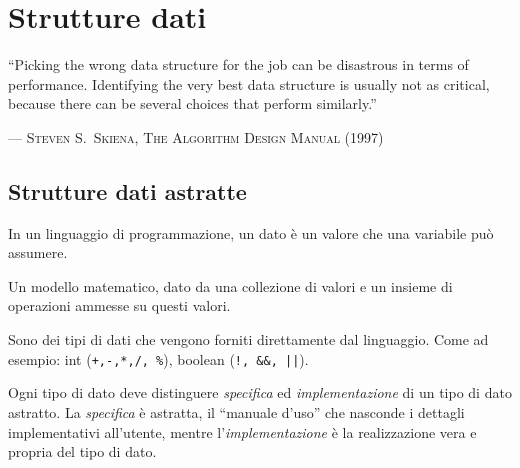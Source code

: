
\ifsubfile
\usepackage[newfloat, cachedir=_minted-cache, outputdir=../build]{minted}
\usepackage{../libraries/set-minted}

\pagestyle{plain}
\setcounter{chapter}{3}


\fi
\chapter{Strutture dati}
\epigraph{``Picking the wrong data structure for the job can be disastrous in terms of performance.
		    Identifying the very best data structure is usually not as critical, because there can be several choices that perform similarly.''}%
		 {--- \textup{\textsc{Steven S.\ Skiena, The Algorithm Design Manual (1997)}}}

\section{Strutture dati astratte}

\begin{definition}
In un linguaggio di programmazione, un dato è un valore che una variabile può assumere.
\end{definition}

\begin{definition}
Un modello matematico, dato da una collezione di valori e un insieme di operazioni ammesse su questi valori.
\end{definition}

\begin{definition}
Sono dei tipi di dati che vengono forniti direttamente dal linguaggio.
Come ad esempio: int (\texttt{+,-,*,/, \%}), boolean (\texttt{!, \&\&, ||}).
\end{definition}

Ogni tipo di dato deve distinguere \emph{specifica} ed \emph{implementazione} di un tipo di dato astratto.
La \emph{specifica} è astratta, il \enquote{manuale d'uso} che nasconde i dettagli implementativi all'utente, mentre l'\emph{implementazione} è la realizzazione vera e propria del tipo di dato.

